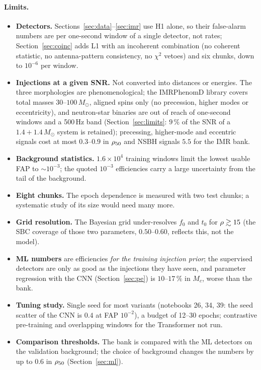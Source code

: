 \paragraph{Limits.}
\begin{itemize}[nosep]
\item \textbf{Detectors.} Sections~\ref{sec:data}--\ref{sec:imr} use H1 alone, so their false-alarm numbers are per one-second window of a single detector, not rates; Section~\ref{sec:coinc} adds L1 with an incoherent combination (no coherent statistic, no antenna-pattern consistency, no $\chi^2$ vetoes) and six chunks, down to $10^{-6}$ per window.
\item \textbf{Injections at a given SNR.} Not converted into distances or energies. The three morphologies are phenomenological; the IMRPhenomD library covers total masses $30$--$100\,M_\odot$, aligned spins only (no precession, higher modes or eccentricity), and neutron-star binaries are out of reach of one-second windows and a 500\,Hz band (Section~\ref{sec:limits}: $9\,\%$ of the SNR of a $1.4+1.4\,M_\odot$ system is retained); precessing, higher-mode and eccentric signals cost at most $0.3$--$0.9$ in $\rho_{50}$ and NSBH signals $5.5$ for the IMR bank.
\item \textbf{Background statistics.} $1.6\times10^4$ training windows limit the lowest usable FAP to $\sim10^{-3}$; the quoted $10^{-3}$ efficiencies carry a large uncertainty from the tail of the background.
\item \textbf{Eight chunks.} The epoch dependence is measured with two test chunks; a systematic study of its size would need many more.
\item \textbf{Grid resolution.} The Bayesian grid under-resolves $f_0$ and $t_0$ for $\rho\gtrsim15$ (the SBC coverage of those two parameters, $0.50$--$0.60$, reflects this, not the model).
\item \textbf{ML numbers} are efficiencies \emph{for the training injection prior}; the supervised detectors are only as good as the injections they have seen, and parameter regression with the CNN (Section~\ref{sec:pe}) is $10$--$17\,\%$ in $M_c$, worse than the bank.
\item \textbf{Tuning study.} Single seed for most variants (notebooks 26, 34, 39: the seed scatter of the CNN is $0.4$ at FAP $10^{-2}$), a budget of 12--30 epochs; contrastive pre-training and overlapping windows for the Transformer not run.
\item \textbf{Comparison thresholds.} The bank is compared with the ML detectors on the validation background; the choice of background changes the numbers by up to $0.6$ in $\rho_{50}$ (Section~\ref{sec:ml}).
\end{itemize}

